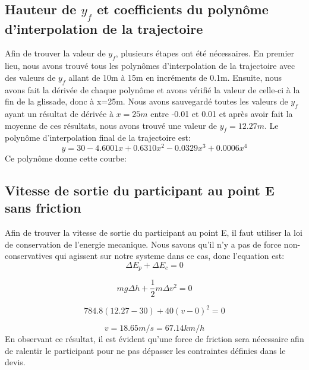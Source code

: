 \documentclass{article}
\begin{document}
\subsection{Hauteur de $y_f$ et coefficients du polynôme d'interpolation de la trajectoire}
Afin de trouver la valeur de $y_f$, plusieurs étapes ont été nécessaires. En premier lieu, nous avons trouvé tous les polynômes d'interpolation de la trajectoire avec des valeurs de $y_f$ allant de 10m à 15m en incréments de 0.1m. Ensuite, nous avons fait la dérivée de  chaque polynôme et avons vérifié la valeur de celle-ci à la fin de la glissade, donc à x=25m. Nous avons sauvegardé toutes les valeurs de $y_f$ ayant un résultat de dérivée à $x=25m$ entre -0.01 et 0.01 et après avoir fait la moyenne de ces résultats, nous avons trouvé une valeur de $y_f=12.27m$. Le polynôme d'interpolation final de la trajectoire est:
\begin{equation}
y = 30-4.6001x+0.6310x^2-0.0329x^3+0.0006x^4
\end{equation}
Ce polynôme donne cette courbe:
\begin{center}
\end{center}

\subsection{Vitesse de sortie du participant au point E sans friction}
Afin de trouver la vitesse de sortie du participant au point E, il faut utiliser la loi de conservation de l'energie mecanique. Nous savons qu'il n'y a pas de force non-conservatives qui agissent sur notre systeme dans ce cas, donc l'equation est:
\begin{equation}
	\Delta E_p + \Delta E_c = 0
\end{equation}

\begin{equation}
	mg\Delta h + \frac{1}{2}m\Delta v^2 = 0
\end{equation}

\begin{equation}
	784.8(12.27-30) + 40(v-0)^2 = 0
\end{equation}

\begin{equation}
	v = 18.65 m/s = 67.14 km/h
\end{equation}
En observant ce résultat, il est évident qu'une force de friction sera nécessaire afin de ralentir le participant pour ne pas dépasser les contraintes définies dans le devis.
\end{document}
